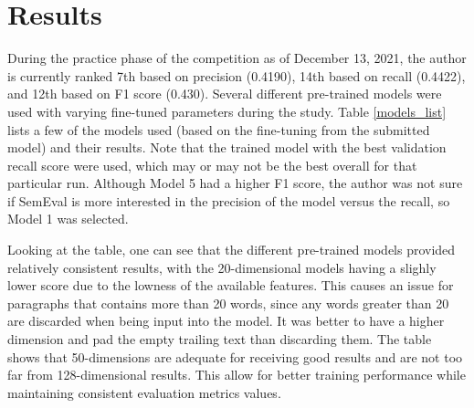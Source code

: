 \documentclass[11pt,a4paper]{article}
\begin{document}
\section{Results}



During the practice phase of the competition as of December 13, 2021, the author is currently ranked 7th based on precision (0.4190), 14th based on recall (0.4422), and 12th based on F1 score (0.430). Several different pre-trained models were used with varying fine-tuned parameters during the study. Table \ref{models_list} lists a few of the models used (based on the fine-tuning from the submitted model) and their results. Note that the trained model with the best validation recall score were used, which may or may not be the best overall for that particular run. Although Model 5 had a higher F1 score, the author was not sure if SemEval is more interested in the precision of the model versus the recall, so Model 1 was selected.

Looking at the table, one can see that the different pre-trained models provided relatively consistent results, with the 20-dimensional models having a slighly lower score due to the lowness of the available features. This causes an issue for paragraphs that contains more than 20 words, since any words greater than 20 are discarded when being input into the model. It was better to have a higher dimension and pad the empty trailing text than discarding them. The table shows that 50-dimensions are adequate for receiving good results and are not too far from 128-dimensional results. This allow for better training performance while maintaining consistent evaluation metrics values. 
\end{document}

